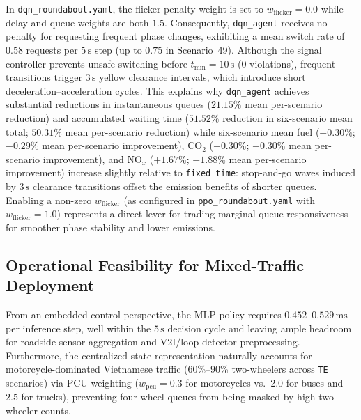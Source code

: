 In \texttt{dqn\_roundabout.yaml}, the flicker penalty weight is set to $w_{\text{flicker}} = 0.0$ while delay and queue weights are both $1.5$. Consequently, \texttt{dqn\_agent} receives no penalty for requesting frequent phase changes, exhibiting a mean switch rate of $0.58$ requests per $5\,\mathrm{s}$ step (up to $0.75$ in Scenario~49). Although the signal controller prevents unsafe switching before $t_{\min}=10\,\mathrm{s}$ ($0$ violations), frequent transitions trigger $3\,\mathrm{s}$ yellow clearance intervals, which introduce short deceleration--acceleration cycles. This explains why \texttt{dqn\_agent} achieves substantial reductions in instantaneous queues ($21.15\%$ mean per-scenario reduction) and accumulated waiting time ($51.52\%$ reduction in six-scenario mean total; $50.31\%$ mean per-scenario reduction) while six-scenario mean fuel ($+0.30\%$; $-0.29\%$ mean per-scenario improvement), $\mathrm{CO}_2$ ($+0.30\%$; $-0.30\%$ mean per-scenario improvement), and $\mathrm{NO}_x$ ($+1.67\%$; $-1.88\%$ mean per-scenario improvement) increase slightly relative to \texttt{fixed\_time}: stop-and-go waves induced by $3\,\mathrm{s}$ clearance transitions offset the emission benefits of shorter queues. Enabling a non-zero $w_{\text{flicker}}$ (as configured in \texttt{ppo\_roundabout.yaml} with $w_{\text{flicker}}=1.0$) represents a direct lever for trading marginal queue responsiveness for smoother phase stability and lower emissions.

\subsection{Operational Feasibility for Mixed-Traffic Deployment}

From an embedded-control perspective, the MLP policy requires $0.452\text{--}0.529\,\mathrm{ms}$ per inference step, well within the $5\,\mathrm{s}$ decision cycle and leaving ample headroom for roadside sensor aggregation and V2I/loop-detector preprocessing. Furthermore, the centralized state representation naturally accounts for motorcycle-dominated Vietnamese traffic (60\%--90\% two-wheelers across \texttt{TE} scenarios) via PCU weighting ($w_{\text{pcu}}=0.3$ for motorcycles vs.\ $2.0$ for buses and $2.5$ for trucks), preventing four-wheel queues from being masked by high two-wheeler counts.
